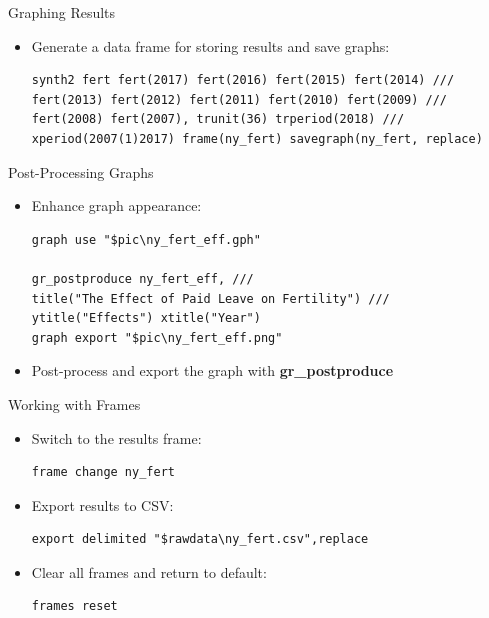 \documentclass[dvipsnames,hyperref={pdfpagelabels=false}]{beamer}
\begin{document}
\begin{frame}[fragile]{Graphing Results}
\begin{itemize}
	\item Generate a data frame for storing results and save graphs:
\begin{lstlisting}
synth2 fert fert(2017) fert(2016) fert(2015) fert(2014) ///
fert(2013) fert(2012) fert(2011) fert(2010) fert(2009) ///
fert(2008) fert(2007), trunit(36) trperiod(2018) ///
xperiod(2007(1)2017) frame(ny_fert) savegraph(ny_fert, replace)
\end{lstlisting}

\end{itemize}
\end{frame}


\begin{frame}[fragile]{Post-Processing Graphs}
\begin{itemize}
	\item Enhance graph appearance:
\vspace{0.2cm}
\begin{lstlisting}
graph use "$pic\ny_fert_eff.gph"

gr_postproduce ny_fert_eff, ///
title("The Effect of Paid Leave on Fertility") ///
ytitle("Effects") xtitle("Year")
graph export "$pic\ny_fert_eff.png"
\end{lstlisting}
\item Post-process and export the graph with \textbf{gr\_postproduce}
\end{itemize}
\end{frame}


\begin{frame}[fragile]{Working with Frames}
\begin{itemize}
	\item Switch to the results frame:
	\vspace{0.2cm}
\begin{lstlisting}
frame change ny_fert
\end{lstlisting}
	\vspace{0.2cm}
	\item Export results to CSV:
	\vspace{0.2cm}
\begin{lstlisting}
export delimited "$rawdata\ny_fert.csv",replace
\end{lstlisting}
	\vspace{0.2cm}
	\item Clear all frames and return to default:
	\vspace{0.2cm}
\begin{lstlisting}
frames reset
\end{lstlisting}
\end{itemize}

\end{frame}
\end{document}
